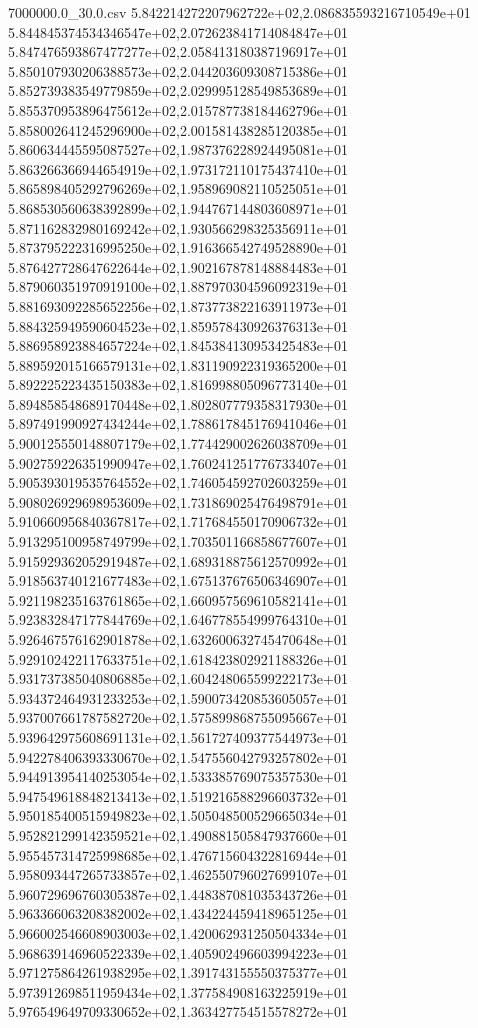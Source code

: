 \begin{filecontents*}{7000000.0_30.0.csv}
5.842214272207962722e+02,2.086835593216710549e+01
5.844845374534346547e+02,2.072623841714084847e+01
5.847476593867477277e+02,2.058413180387196917e+01
5.850107930206388573e+02,2.044203609308715386e+01
5.852739383549779859e+02,2.029995128549853689e+01
5.855370953896475612e+02,2.015787738184462796e+01
5.858002641245296900e+02,2.001581438285120385e+01
5.860634445595087527e+02,1.987376228924495081e+01
5.863266366944654919e+02,1.973172110175437410e+01
5.865898405292796269e+02,1.958969082110525051e+01
5.868530560638392899e+02,1.944767144803608971e+01
5.871162832980169242e+02,1.930566298325356911e+01
5.873795222316995250e+02,1.916366542749528890e+01
5.876427728647622644e+02,1.902167878148884483e+01
5.879060351970919100e+02,1.887970304596092319e+01
5.881693092285652256e+02,1.873773822163911973e+01
5.884325949590604523e+02,1.859578430926376313e+01
5.886958923884657224e+02,1.845384130953425483e+01
5.889592015166579131e+02,1.831190922319365200e+01
5.892225223435150383e+02,1.816998805096773140e+01
5.894858548689170448e+02,1.802807779358317930e+01
5.897491990927434244e+02,1.788617845176941046e+01
5.900125550148807179e+02,1.774429002626038709e+01
5.902759226351990947e+02,1.760241251776733407e+01
5.905393019535764552e+02,1.746054592702603259e+01
5.908026929698953609e+02,1.731869025476498791e+01
5.910660956840367817e+02,1.717684550170906732e+01
5.913295100958749799e+02,1.703501166858677607e+01
5.915929362052919487e+02,1.689318875612570992e+01
5.918563740121677483e+02,1.675137676506346907e+01
5.921198235163761865e+02,1.660957569610582141e+01
5.923832847177844769e+02,1.646778554999764310e+01
5.926467576162901878e+02,1.632600632745470648e+01
5.929102422117633751e+02,1.618423802921188326e+01
5.931737385040806885e+02,1.604248065599222173e+01
5.934372464931233253e+02,1.590073420853605057e+01
5.937007661787582720e+02,1.575899868755095667e+01
5.939642975608691131e+02,1.561727409377544973e+01
5.942278406393330670e+02,1.547556042793257802e+01
5.944913954140253054e+02,1.533385769075357530e+01
5.947549618848213413e+02,1.519216588296603732e+01
5.950185400515949823e+02,1.505048500529665034e+01
5.952821299142359521e+02,1.490881505847937660e+01
5.955457314725998685e+02,1.476715604322816944e+01
5.958093447265733857e+02,1.462550796027699107e+01
5.960729696760305387e+02,1.448387081035343726e+01
5.963366063208382002e+02,1.434224459418965125e+01
5.966002546608903003e+02,1.420062931250504334e+01
5.968639146960522339e+02,1.405902496603994223e+01
5.971275864261938295e+02,1.391743155550375377e+01
5.973912698511959434e+02,1.377584908163225919e+01
5.976549649709330652e+02,1.363427754515578272e+01

\end{filecontents*}
